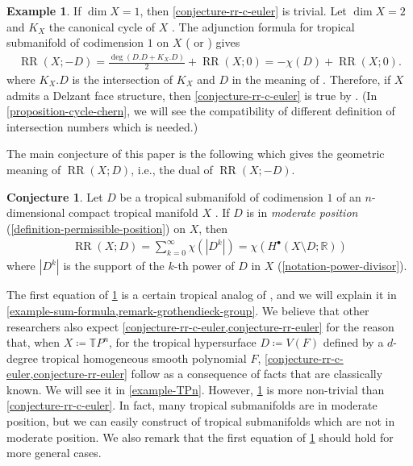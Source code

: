 \documentclass[a4paper,dvipdfmx,reqno,12pt]{amsart}
\theoremstyle{definition}
\newtheorem{example}[theorem]{Example}
\newtheorem{conjecture}[theorem]{Conjecture}
\newcommand{\deq}{\coloneqq}
\newcommand{\opn}[1]{\operatorname{#1}}
\numberwithin{equation}{section}
\begin{document}
\begin{example}
If $\dim X=1$, then 
\cref{conjecture-rr-c-euler} is trivial.
Let $\dim X=2$ and $K_X$ the canonical cycle of
$X$ \cite[Definition 5.8]{MR2275625}.
The adjunction formula for tropical submanifold
of codimension $1$ on $X$
(\cite[Theorem 6]{shaw2015tropical} or 
\cite[Theorem 5.2]{demedrano2023chern}) gives
\begin{align}
\opn{RR}(X;-D)=\frac{\opn{deg}(D.D+K_X.D)}{2}+\opn{RR}(X;0)
=-\chi(D)+\opn{RR}(X;0).
\end{align}
where $K_X.D$ is the intersection of 
$K_X$ and $D$ in the meaning of \cite{shaw2015tropical}.
Therefore, if $X$ admits a Delzant face structure,
then \cref{conjecture-rr-c-euler} is true
by \cite[Theorem 6.3]{demedrano2023chern}.
(In \cref{proposition-cycle-chern}, we will see the compatibility of different definition of
intersection numbers which is needed.)
\end{example}

The main conjecture of this paper is the following 
which gives
the geometric meaning of $\opn{RR}(X;D)$, i.e.,
the dual of $\opn{RR}(X;-D)$.

\begin{conjecture}
\label{conjecture-rr-euler}
Let $D$ be a tropical submanifold of codimension 
$1$ of an $n$-dimensional compact tropical manifold $X$
\cite[Definition 2.14]{demedrano2023chern}.
If $D$ is in \emph{moderate position}
(\cref{definition-permissible-position}) on $X$,
then 
\begin{align}
\opn{RR}(X;D)=\sum_{k=0}^{\infty}\chi(|D^k|)
=\chi(H^{\bullet}(X\setminus D;\mathbb{R}))
\end{align}
where $|D^{k}|$ is the support of the $k$-th power
of $D$ in $X$ (\cref{notation-power-divisor}).
\end{conjecture}
The first equation of \cref{conjecture-rr-euler}
is a certain tropical analog of
\cite[. (14)]{MR1335917},
and we will explain it in \cref{example-sum-formula,remark-grothendieck-group}.
We believe that other researchers also expect 
\cref{conjecture-rr-c-euler,conjecture-rr-euler} for 
the reason that,
when $X \deq \mathbb{T}P^n$,
for the tropical hypersurface $D \deq V(F)$
defined by a $d$-degree tropical homogeneous
smooth polynomial $F$, 
\cref{conjecture-rr-c-euler,conjecture-rr-euler}
follow as a consequence of facts
that are classically known.
We will see it in \cref{example-TPn}.
However,
\cref{conjecture-rr-euler} is more non-trivial than
\cref{conjecture-rr-c-euler}.
In fact, many tropical submanifolds are in moderate position,
but we can easily construct of tropical submanifolds
which are not in moderate position.
We also remark that the first equation of
\cref{conjecture-rr-euler} should hold for more general
cases.
\end{document}
